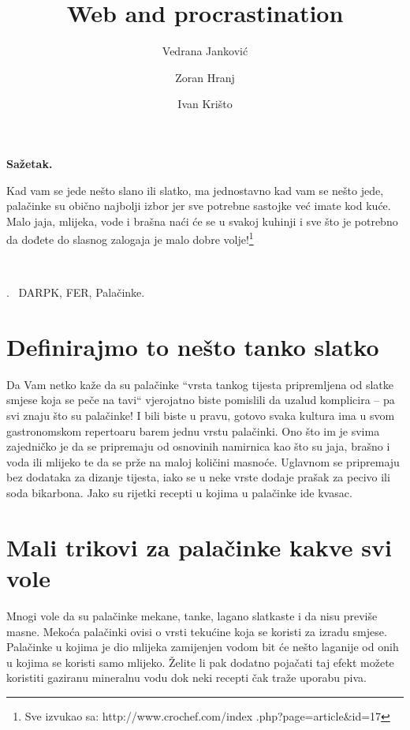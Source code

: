 \documentclass[11pt,twocolumn,english]{article}
\let\LaTeXtitle\title
\renewcommand{\title}[1]{\LaTeXtitle{\Large \textbf{#1}}}
\renewenvironment{abstract}
{\noindent \large \bf Sažetak. \normalsize \begin{it}}
{\end{it}\\}
\newenvironment{keywords}
{\noindent {\large {\bf Ključne riječi}}.~}{}
\begin{document}
\title{Web and procrastination}
\author{Vedrana Janković}
\author{Zoran Hranj}
\author{Ivan Krišto}
\date{}

\maketitle
\thispagestyle{empty}
\pagestyle{empty}

\begin{abstract}
Kad vam se jede nešto slano ili slatko, ma jednostavno kad vam se nešto jede,
palačinke su obično najbolji izbor jer sve potrebne sastojke već imate kod kuće.
Malo jaja, mlijeka, vode i brašna naći će se u svakoj kuhinji i sve što je
potrebno da dođete do slasnog zalogaja je malo dobre volje!\footnote{Sve
izvukao sa: http://www.crochef.com/index .php?page=article\&id=17}
\end{abstract}

\begin{keywords}
DARPK, FER, Palačinke.
\end{keywords}

\section{Definirajmo to nešto tanko slatko}
Da Vam netko kaže da su palačinke  “vrsta tankog tijesta pripremljena od slatke
smjese koja se peče na tavi“ vjerojatno biste pomislili da uzalud komplicira – pa
svi znaju što su palačinke! I bili biste u pravu, gotovo svaka kultura ima u svom
gastronomskom repertoaru barem jednu vrstu palačinki. Ono što im je svima
zajedničko je da se pripremaju od osnovinih namirnica kao što su jaja, brašno i
voda ili mlijeko te da se prže na maloj količini masnoće. Uglavnom se pripremaju
bez dodataka za dizanje tijesta, iako se u neke vrste dodaje prašak za pecivo ili
soda bikarbona. Jako su rijetki recepti u kojima u palačinke ide kvasac.

\section{Mali trikovi za palačinke kakve svi vole}
Mnogi vole da su palačinke mekane, tanke, lagano slatkaste i da nisu previše
masne. Mekoća palačinki ovisi o vrsti tekućine koja se koristi za izradu smjese.
Palačinke u kojima je dio mlijeka zamijenjen vodom bit će nešto laganije od onih
u kojima se koristi samo mlijeko. Želite li pak dodatno pojačati taj efekt možete
koristiti gaziranu mineralnu vodu dok neki recepti čak traže uporabu piva.
\end{document}
